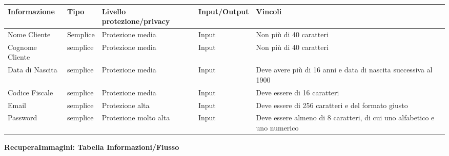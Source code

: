\begin{tabular} {|P{3cm}|P{3cm}|P{3cm}|P{3cm}|P{3cm}|}
    \hline
    \textbf{Informazione} & \textbf{Tipo} & \textbf{Livello protezione/privacy} & \textbf{Input/Output} & \textbf{Vincoli}                                                        \\
    \hline
    Nome Cliente          & Semplice      & Protezione media                    & Input                 & Non più di 40 caratteri                                                 \\
    \hline
    Cognome Cliente       & semplice      & Protezione media                    & Input                 & Non più di 40 caratteri                                                 \\
    \hline
    Data di Nascita       & semplice      & Protezione media                    & Input                 & Deve avere più di 16 anni e data di nascita successiva al 1900          \\
    \hline
    Codice Fiscale        & semplice      & Protezione media                    & Input                 & Deve essere di 16 caratteri                                             \\
    \hline
    Email                 & semplice      & Protezione alta                     & Input                 & Deve essere di 256 caratteri e del formato giusto                       \\
    \hline
    Password              & semplice      & Protezione molto alta               & Input                 & Deve essere almeno di 8 caratteri, di cui uno alfabetico e uno numerico \\
    \hline
\end{tabular}
\hfill \break

\textbf{RecuperaImmagini: Tabella Informazioni/Flusso}
\hfill \break

